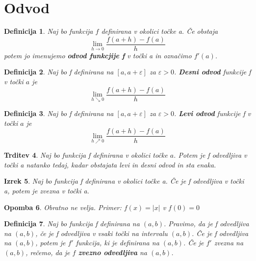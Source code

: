 \documentclass[11pt]{article}
\newtheorem{Izrek}{{\sc Izrek}}[section]
\newtheorem{Trditev}[Izrek]{{\sc Trditev}}
\newtheorem{Definicija}[Izrek]{{\sc Definicija}}
\newtheorem{Opomba}[Izrek]{{\sc Opomba}}
\begin{document}
\section{Odvod}
\begin{Definicija}
	Naj bo funkcija $f$ definirana v okolici točke a. Če obstaja
	$$ \lim\limits_{h \to 0}{\frac{f(a+h) - f(a)}{h}}$$ potem jo imenujemo \textbf{odvod funkcjije f} v točki a in označimo $f'(a)$.
\end{Definicija}
\begin{Definicija}
	Naj bo f definirana na $[a, a+\varepsilon]$ za $\varepsilon > 0$. \textbf{Desni odvod} funkcije f v točki $a$ je
	$$ \lim\limits_{h \searrow 0}{\frac{f(a+h) - f(a)}{h}}$$
\end{Definicija}
\begin{Definicija}
	Naj bo f definirana na $[a, a+\varepsilon]$ za $\varepsilon > 0$. \textbf{Levi odvod} funkcije f v točki $a$ je
	$$ \lim\limits_{h \nearrow 0}{\frac{f(a+h) - f(a)}{h}}$$
\end{Definicija}
\begin{Trditev}
	Naj bo funkcija f definirana v okolici točke $a$. Potem je f odvedljiva v točki a natanko tedaj, kadar obstajata levi in desni odvod in sta enaka.
\end{Trditev}
\begin{Izrek}
	Naj bo funkcija f definirana v okolici točke a. Če je f odvedljiva v točki a, potem je zvezna v točki a.
\end{Izrek}
\begin{Opomba}
	Obratno ne velja. Primer: $f(x) = |x|$ v $f(0) = 0$
\end{Opomba}
\begin{Definicija}
	Naj bo funkcija f definirana na $(a,b)$. Pravimo, da je f odvedljiva na $(a,b)$, če je f odvedljiva v vsaki točki na intervalu $(a,b)$. Če je f odvedljiva na $(a,b)$, potem je $f'$ funkcija, ki je definirana na $(a,b)$. Če je $f'$ zvezna na $(a,b)$, rečemo, da je $f$ \textbf{zvezno odvedljiva} na $(a,b)$.
\end{Definicija}
\end{document}
